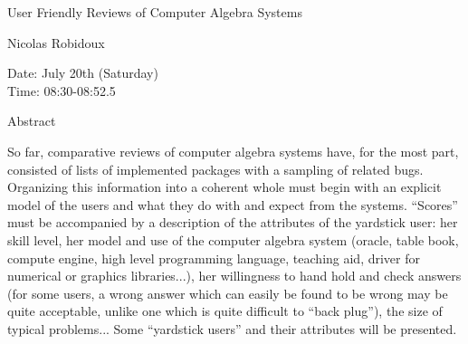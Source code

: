 \begin{center}
\LARGE
User Friendly Reviews of Computer Algebra Systems
\end{center}

\begin{center}
\Large
Nicolas Robidoux

\end{center}

\noindent
Date: July 20th (Saturday) \\
Time:  08:30-08:52.5 \\

\begin{center}
\large
Abstract
\end{center}

So far, comparative reviews of computer algebra systems have, for the most part, consisted of lists
of implemented packages with a sampling of related bugs. Organizing this information into a
coherent whole must begin with an explicit model of the users and what they do with and expect
from the systems. ``Scores'' must be accompanied by a description of the attributes of the yardstick
user: her skill level, her model and use of the computer algebra system (oracle, table book,
compute engine, high level programming language, teaching aid, driver for numerical or graphics
libraries...), her willingness to hand hold and check answers (for some users, a wrong answer which
can easily be found to be wrong may be quite acceptable, unlike one which is quite difficult to
``back plug''), the size of typical problems... Some ``yardstick users'' and their attributes will be
presented. 

